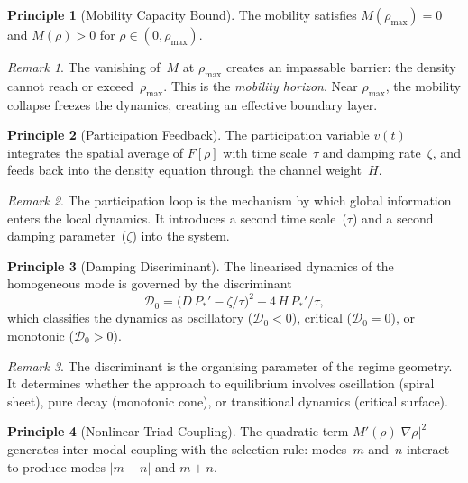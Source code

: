 \documentclass[11pt,twoside,openright]{book}
\theoremstyle{definition}
\theoremstyle{plain}
\theoremstyle{definition}
\newtheorem{principle}{Principle}[chapter]
\theoremstyle{remark}
\newtheorem{remark}{Remark}[chapter]
\newcommand{\rhomax}{\rho_{\max}}
\newcommand{\Fop}{F[\rho]}
\newcommand{\Disc}{\mathscr{D}_0}
\begin{document}
\begin{principle}[Mobility Capacity Bound]\label{prin:capacity}
The mobility satisfies \(M(\rhomax) = 0\) and \(M(\rho) > 0\) for \(\rho \in (0, \rhomax)\).
\end{principle}

\begin{remark}\label{rem:prin4}
The vanishing of~\(M\) at \(\rhomax\) creates an impassable barrier: the density cannot reach or exceed~\(\rhomax\). This is the \emph{mobility horizon}. Near \(\rhomax\), the mobility collapse freezes the dynamics, creating an effective boundary layer.
\end{remark}

\begin{principle}[Participation Feedback]\label{prin:feedback}
The participation variable \(v(t)\) integrates the spatial average of \(\Fop\) with time scale~\(\tau\) and damping rate~\(\zeta\), and feeds back into the density equation through the channel weight~\(H\).
\end{principle}

\begin{remark}\label{rem:prin5}
The participation loop is the mechanism by which global information enters the local dynamics. It introduces a second time scale~(\(\tau\)) and a second damping parameter~(\(\zeta\)) into the system.
\end{remark}

\begin{principle}[Damping Discriminant]\label{prin:discriminant}
The linearised dynamics of the homogeneous mode is governed by the discriminant
\begin{equation}\label{eq:discriminant}
\Disc = \bigl(D\,P_*' - \zeta/\tau\bigr)^2 - 4\,H\,P_*'/\tau,
\end{equation}
which classifies the dynamics as oscillatory (\(\Disc < 0\)), critical (\(\Disc = 0\)), or monotonic (\(\Disc > 0\)).
\end{principle}

\begin{remark}\label{rem:prin6}
The discriminant is the organising parameter of the regime geometry. It determines whether the approach to equilibrium involves oscillation (spiral sheet), pure decay (monotonic cone), or transitional dynamics (critical surface).
\end{remark}

\begin{principle}[Nonlinear Triad Coupling]\label{prin:triad}
The quadratic term \(M'(\rho)|\nabla\rho|^2\) generates inter-modal coupling with the selection rule: modes~\(m\) and~\(n\) interact to produce modes \(|m-n|\) and \(m+n\).
\end{principle}
\end{document}
